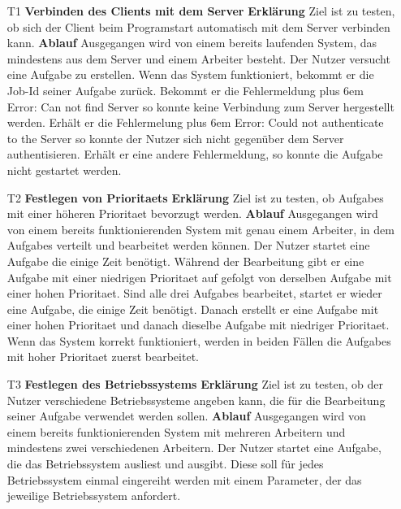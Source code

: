 \documentclass[a4paper,12pt]{article}
\makeatletter
\newenvironment{mycode}
 {\def\@xobeysp{\ }\verbatim\rightskip=0pt plus 6em\relax}
 {\endverbatim}
\makeatother
\begin{document}
\begin{itemize}
\item[T1] \textbf{Verbinden des \glspl{Client} mit dem \gls{Server}}
\subitem \textbf{Erklärung} Ziel ist zu testen, ob sich der \gls{Client} beim Programstart automatisch mit dem \gls{Server} verbinden kann.
\subitem \textbf{Ablauf} Ausgegangen wird von einem bereits laufenden System, das mindestens aus dem \gls{Server} und einem Arbeiter besteht.
Der Nutzer versucht eine \gls{Aufgabe} zu erstellen.
Wenn das System funktioniert, bekommt er die Job-Id seiner \gls{Aufgabe} zurück.
Bekommt er die Fehlermeldung
\begin{mycode}
Error: Can not find \gls{Server}
\end{mycode}
so konnte keine Verbindung zum \gls{Server} hergestellt werden. Erhält er die Fehlermelung
\begin{mycode}
Error: Could not authenticate to the \gls{Server}
\end{mycode}
so konnte der Nutzer sich nicht gegenüber dem \gls{Server} authentisieren. Erhält er eine andere Fehlermeldung, so konnte die \gls{Aufgabe} nicht gestartet werden.

\item[T2] \textbf{Festlegen von \glspl{Prioritaet} }
\subitem \textbf{Erklärung} Ziel ist zu testen, ob \glspl{Aufgabe} mit einer höheren \gls{Prioritaet} bevorzugt werden.
\subitem \textbf{Ablauf} Ausgegangen wird von einem bereits funktionierenden System mit genau einem Arbeiter, in dem \glspl{Aufgabe} verteilt und bearbeitet werden können.
Der Nutzer startet eine \gls{Aufgabe} die einige Zeit benötigt. Während der Bearbeitung gibt er eine \gls{Aufgabe} mit einer niedrigen \gls{Prioritaet} auf gefolgt von derselben \gls{Aufgabe} mit einer hohen \gls{Prioritaet}.
Sind alle drei \glspl{Aufgabe} bearbeitet, startet er wieder eine \gls{Aufgabe}, die einige Zeit benötigt. Danach erstellt er eine \gls{Aufgabe} mit einer hohen \gls{Prioritaet} und danach dieselbe \gls{Aufgabe} mit niedriger \gls{Prioritaet}.
Wenn das System korrekt funktioniert, werden in beiden Fällen die \glspl{Aufgabe} mit hoher \gls{Prioritaet} zuerst bearbeitet.

\item[T3] \textbf{Festlegen des Betriebssystems}
\subitem \textbf{Erklärung} Ziel ist zu testen, ob der Nutzer verschiedene Betriebssysteme angeben kann, die für die Bearbeitung seiner \gls{Aufgabe} verwendet werden sollen.
\subitem \textbf{Ablauf} Ausgegangen wird von einem bereits funktionierenden System mit mehreren Arbeitern und mindestens zwei verschiedenen Arbeitern. Der Nutzer startet eine \gls{Aufgabe}, die das Betriebssystem ausliest und ausgibt. Diese soll für jedes Betriebssystem einmal eingereiht werden mit einem \gls{Parameter}, der das jeweilige Betriebssystem anfordert.


\end{itemize}
\end{document}
